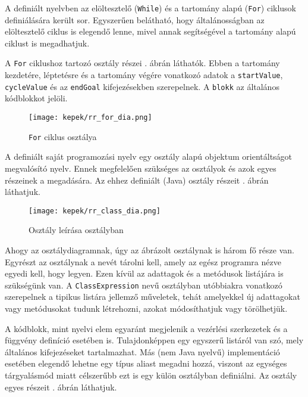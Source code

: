 
A definiált nyelvben az elöltesztelő (\texttt{While}) és a tartomány alapú (\texttt{For}) ciklusok definiálására került sor. Egyszerűen belátható, hogy általánosságban az elöltesztelő ciklus is elegendő lenne, mivel annak segítségével a tartomány alapú ciklust is megadhatjuk.

A \texttt{For} ciklushoz tartozó osztály részei . ábrán láthatók. Ebben a tartomány kezdetére, léptetésre és a tartomány végére vonatkozó adatok a \texttt{startValue}, \texttt{cycleValue} és az \texttt{endGoal} kifejezésekben szerepelnek. A \texttt{blokk} az általános kódblokkot jelöli.

\begin{figure}[h!]
\centering
\texttt{[image: kepek/rr\_for\_dia.png]}
\caption{\texttt{For} ciklus osztálya}
\label{fig:for}
\end{figure}


A definiált saját programozási nyelv egy osztály alapú objektum orientáltságot megvalósító nyelv. Ennek megfelelően szükséges az osztályok és azok egyes részeinek a megadására. Az ehhez definiált (Java) osztály részeit . ábrán láthatjuk.

\begin{figure}[h!]
\centering
\texttt{[image: kepek/rr\_class\_dia.png]}
\caption{Osztály leírása osztályban}
\label{fig:class}
\end{figure}

Ahogy az osztálydiagramnak, úgy az ábrázolt osztálynak is három fő része van. Egyrészt az osztálynak a nevét tárolni kell, amely az egész programra nézve egyedi kell, hogy legyen. Ezen kívül az adattagok és a metódusok listájára is szükségünk van. A \texttt{ClassExpression} nevű osztályban utóbbiakra vonatkozó szerepelnek a tipikus listára jellemző műveletek, tehát amelyekkel új adattagokat vagy metódusokat tudunk létrehozni, azokat módosíthatjuk vagy törölhetjük.


A kódblokk, mint nyelvi elem egyaránt megjelenik a vezérlési szerkezetek és a függvény definíció esetében is. Tulajdonképpen egy egyszerű listáról van szó, mely általános kifejezéseket tartalmazhat. Más (nem Java nyelvű) implementáció esetében elegendő lehetne egy típus aliast megadni hozzá, viszont az egységes tárgyalásmód miatt célszerűbb ezt is egy külön osztályban definiálni. Az osztály egyes részeit . ábrán láthatjuk.

